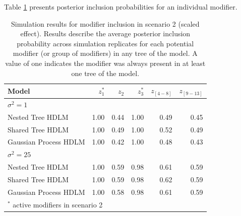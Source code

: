 \documentclass[12pt]{article}
\begin{document}
Table \ref{tab:scen2_inca} presents posterior inclusion probabilities for an individual modifier.

\begin{table}[!ht]
 \scriptsize
    \centering
    \caption{Simulation results for modifier inclusion in scenario 2 (scaled effect). Results describe the average posterior inclusion probability across simulation replicates for each potential modifier (or group of modifiers) in any tree of the model. A value of one indicates the modifier was always present in at least one tree of the model.}\vspace{6pt}
    \label{tab:scen2_inca}
    \begin{tabular}{lrrrrr}
        \toprule[2pt]
        Model & $z_1^*$ & $z_2$ & $z_3^*$ & $z_{[4-8]}$ & $z_{[9-13]}$\\
        
        \midrule
        \multicolumn{6}{l}{$\sigma^2=1$}\\
Nested Tree HDLM & 1.00 & 0.44 & 1.00 & 0.49 & 0.45\\
Shared Tree HDLM & 1.00 & 0.49 & 1.00 & 0.52 & 0.49\\
Gaussian Process HDLM & 1.00 & 0.42 & 1.00 & 0.48 & 0.43\\
       
        \midrule
        \multicolumn{6}{l}{$\sigma^2=25$}\\
Nested Tree HDLM & 1.00 & 0.59 & 0.98 & 0.61 & 0.59\\
Shared Tree HDLM & 1.00 & 0.59 & 0.98 & 0.62 & 0.59\\
Gaussian Process HDLM & 1.00 & 0.58 & 0.98 & 0.61 & 0.59\\
        \bottomrule[2pt]
        \multicolumn{6}{l}{$^*$ active modifiers in scenario 2}\\
    \end{tabular}
\end{table}
\end{document}
